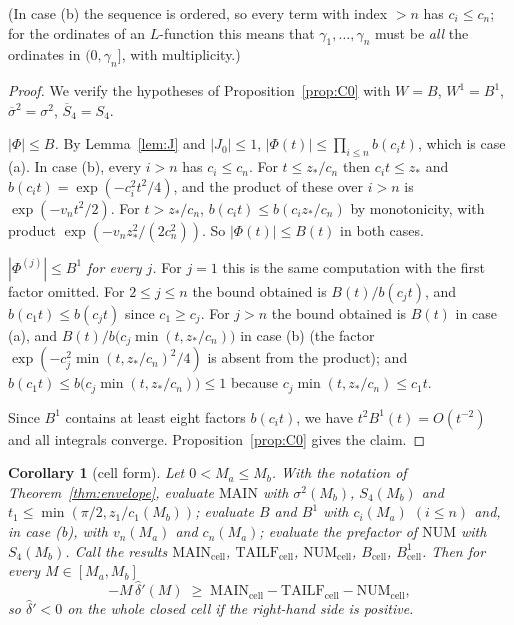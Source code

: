 \documentclass[11pt]{amsart}
\newtheorem{corollary}[theorem]{Corollary}
\theoremstyle{definition}
\numberwithin{equation}{section}
\newcommand{\hd}{\widehat\delta}
\begin{document}
(In case (b) the sequence is ordered, so every term with index $>n$
has $c_i\le c_n$; for the ordinates of an $L$-function this means
that $\gamma_1,\dots,\gamma_n$ must be \emph{all} the ordinates in
$(0,\gamma_n]$, with multiplicity.)

\begin{proof}
We verify the hypotheses of Proposition~\ref{prop:C0} with $W=B$,
$W^1=B^1$, $\overline{\sigma}^2=\sigma^2$, $\overline S_4=S_4$.

\emph{$|\Phi|\le B$.} By Lemma~\ref{lem:J} and $|J_0|\le1$,
$|\Phi(t)|\le\prod_{i\le n}b(c_it)$, which is case (a). In case (b),
every $i>n$ has $c_i\le c_n$. For $t\le z_*/c_n$ then $c_it\le z_*$
and $b(c_it)=\exp(-c_i^2t^2/4)$, and the product of these over $i>n$
is $\exp(-v_nt^2/2)$. For $t>z_*/c_n$,
$b(c_it)\le b(c_iz_*/c_n)$ by monotonicity, with product
$\exp(-v_nz_*^2/(2c_n^2))$. So $|\Phi(t)|\le B(t)$ in both cases.

\emph{$|\Phi^{(j)}|\le B^1$ for every $j$.} For $j=1$ this is the same
computation with the first factor omitted. For $2\le j\le n$ the
bound obtained is $B(t)/b(c_jt)$, and $b(c_1t)\le b(c_jt)$ since
$c_1\ge c_j$. For $j>n$ the bound obtained is $B(t)$ in case (a), and
$B(t)/b\bigl(c_j\min(t,z_*/c_n)\bigr)$ in case (b) (the factor
$\exp(-c_j^2\min(t,z_*/c_n)^2/4)$ is absent from the product); and
$b(c_1t)\le b\bigl(c_j\min(t,z_*/c_n)\bigr)\le1$ because
$c_j\min(t,z_*/c_n)\le c_1t$.

Since $B^1$ contains at least eight factors $b(c_it)$, we have
$t^2B^1(t)=O(t^{-2})$ and all integrals converge.
Proposition~\ref{prop:C0} gives the claim.
\end{proof}

\begin{corollary}[cell form]\label{cor:cell}
Let $0<M_a\le M_b$. With the notation of Theorem~\ref{thm:envelope},
evaluate $\mathrm{MAIN}$ with $\sigma^2(M_b)$, $S_4(M_b)$ and
$t_1\le\min(\pi/2,z_1/c_1(M_b))$; evaluate $B$ and $B^1$ with
$c_i(M_a)$ $(i\le n)$ and, in case \textup{(b)}, with $v_n(M_a)$ and
$c_n(M_a)$; evaluate the prefactor of $\mathrm{NUM}$ with $S_4(M_b)$.
Call the results $\mathrm{MAIN}_{\mathrm{cell}}$,
$\mathrm{TAILF}_{\mathrm{cell}}$, $\mathrm{NUM}_{\mathrm{cell}}$,
$B_{\mathrm{cell}}$, $B^1_{\mathrm{cell}}$. Then for every
$M\in[M_a,M_b]$
\[
-M\,\hd'(M)\;\ge\;\mathrm{MAIN}_{\mathrm{cell}}
-\mathrm{TAILF}_{\mathrm{cell}}-\mathrm{NUM}_{\mathrm{cell}} ,
\]
so $\hd'<0$ on the whole closed cell if the right-hand side is
positive.
\end{corollary}
\end{document}
